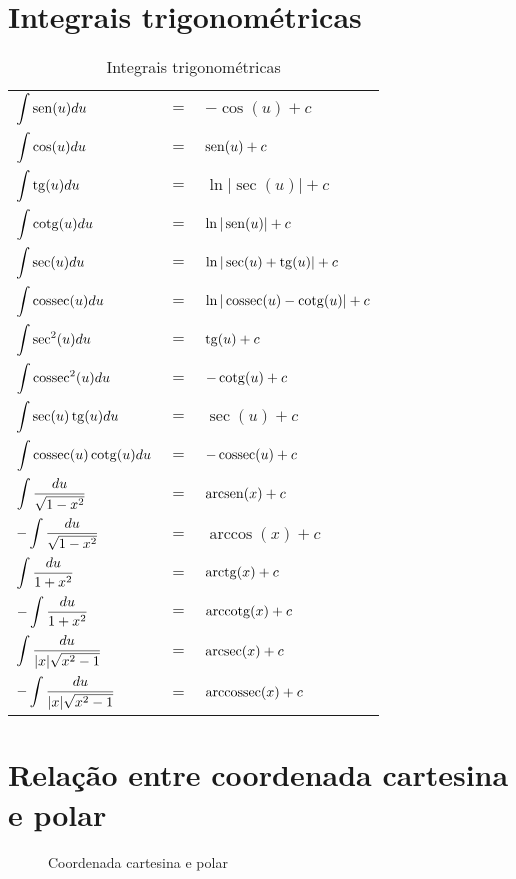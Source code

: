 \section{Integrais trigonométricas}
	\begin{table}[H]
		\caption{Integrais trigonométricas}
		\label{integrais_trigonometricas}
		\centering
		\begin{tabular}{|lcl|}
			$\displaystyle\int \operatorname{sen}(u)du$                      & $=$ & $-\cos(u) + c$                   \\
			$\displaystyle\int \cos(u)du$                      & $=$ & $\operatorname{sen}(u) + c$                    \\
			$\displaystyle\int \operatorname{tg}(u)du$                       & $=$ & $\ln|\sec(u)| + c$               \\
			$\displaystyle\int \operatorname{cotg}(u)du$                     & $=$ & $\ln|\operatorname{sen}(u)| + c$               \\
			$\displaystyle\int \sec(u)du$                      & $=$ & $\ln|\sec(u) + \operatorname{tg}(u)| + c$      \\
			$\displaystyle\int \operatorname{cossec}(u)du$                   & $=$ & $\ln|\operatorname{cossec}(u) - \operatorname{cotg}(u)| + c$ \\
			$\displaystyle\int \sec^2(u)du$                    & $=$ & $\operatorname{tg}(u) + c$                     \\
			$\displaystyle\int \operatorname{cossec}^2(u)du$                 & $=$ & $-\operatorname{cotg}(u) + c$                  \\
			$\displaystyle\int \sec(u)\operatorname{tg}(u)du$                & $=$ & $\sec(u) + c$                    \\
			$\displaystyle\int \operatorname{cossec}(u)\operatorname{cotg}(u)du$           & $=$ & $-\operatorname{cossec}(u) + c$                \\
			$\displaystyle\int \dfrac{du}{\sqrt{1 - x^2}}$     & $=$ & $\operatorname{arcsen}(x) + c$                 \\
			$-\displaystyle\int \dfrac{du}{\sqrt{1 - x^2}}$    & $=$ & $\arccos(x) + c$                 \\
			$\displaystyle\int \dfrac{du}{1 + x^2}$            & $=$ & $\operatorname{arctg}(x) + c$                  \\
			$-\displaystyle\int \dfrac{du}{1 + x^2}$           & $=$ & $\operatorname{arccotg}(x) + c$                \\
			$\displaystyle\int \dfrac{du}{|x|\sqrt{x^2 - 1}}$  & $=$ & $\operatorname{arcsec}(x) + c$                 \\
			$-\displaystyle\int \dfrac{du}{|x|\sqrt{x^2 - 1}}$ & $=$ & $\operatorname{arccossec}(x) + c$
		\end{tabular}		
	\end{table}

\section{Relação entre coordenada cartesina e polar}
	\begin{figure}[H]
		\caption{Coordenada cartesina e polar}
		\label{coordenada_cartesiana_polar}
		\centering		
		\quad\quad
	\end{figure}
	
